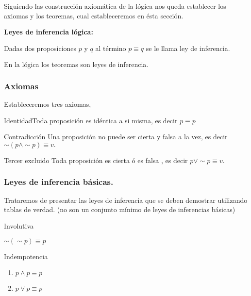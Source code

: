 Siguiendo las construcción axiomática de la lógica nos queda establecer
los axiomas y los teoremas, cual estableceremos en ésta sección. 

\begin{ideabox}{\bf Leyes de inferencia lógica:}

Dadas dos proposiciones $p$ y $q$ al término $p\equiv q$ se le
llama ley de inferencia.

\end{ideabox}

En la lógica los teoremas son leyes de inferencia.

\subsubsection{Axiomas}

Estableceremos tres axiomas,

\begin{axioma}{ Identidad}{}Toda proposición es idéntica a si misma,
es decir $p\equiv p$\end{axioma}

\begin{axioma}{Contradicción }{}Una proposición no puede ser cierta
y falsa a la vez, es decir $\sim\left(p\wedge\sim p\right)\equiv v.$\end{axioma}

\begin{axioma}{Tercer excluido }{}Toda proposición es cierta ó es
falsa , es decir $p\vee\sim p\equiv v.$\end{axioma}

\subsubsection{Leyes de inferencia básicas.}

Trataremos de presentar las leyes de inferencia que se deben demostrar
utilizando tablas de verdad. (no son un conjunto mínimo de leyes de
inferencias básicas)

\begin{ley}{Involutiva}

$\sim\left(\sim p\right)\equiv p$

\end{ley}

\begin{ley}{Indempotencia}
\begin{enumerate}
\item $p\wedge p\equiv p$
\item $p\vee p\equiv p$
\end{enumerate}
\end{ley}

